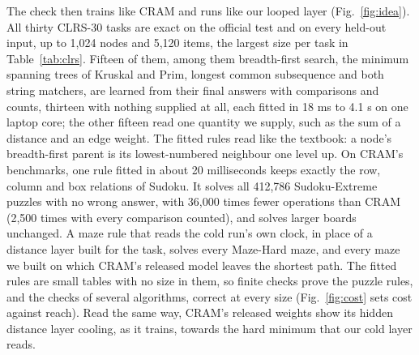 \documentclass[10pt]{article}
\begin{document}
The check then trains like CRAM and runs like our looped layer (Fig.~\ref{fig:idea}). All thirty CLRS-30 tasks are
exact on the official test and on every held-out input, up to 1,024 nodes and 5,120 items,
the largest size per task in Table~\ref{tab:clrs}. Fifteen of them, among them breadth-first search, the minimum spanning
trees of Kruskal and Prim, longest common subsequence and both string matchers, are learned from their final answers
with comparisons and counts, thirteen with nothing supplied at all, each fitted in 18 ms to 4.1 s on one laptop core; the other fifteen read one quantity we supply,
such as the sum of a distance and an edge weight. The fitted rules read like the textbook: a node's breadth-first parent
is its lowest-numbered neighbour one level up. On CRAM's benchmarks, one rule fitted in about 20 milliseconds keeps
exactly the row, column and box relations of Sudoku. It solves all 412,786 Sudoku-Extreme puzzles with no
wrong answer, with 36,000 times fewer operations than CRAM (2,500 times with every comparison
counted), and solves larger boards unchanged. A maze
rule that reads the cold run's own clock, in place of a distance layer built for the task, solves every Maze-Hard maze,
and every maze we built on which CRAM's released model leaves the shortest path. The fitted rules are small tables with
no size in them, so finite checks prove the puzzle rules, and the checks of several algorithms, correct at every size
(Fig.~\ref{fig:cost} sets cost against reach). Read the same way, CRAM's released weights show its hidden distance
layer cooling, as it trains, towards the hard minimum that our cold layer reads.
\end{document}
